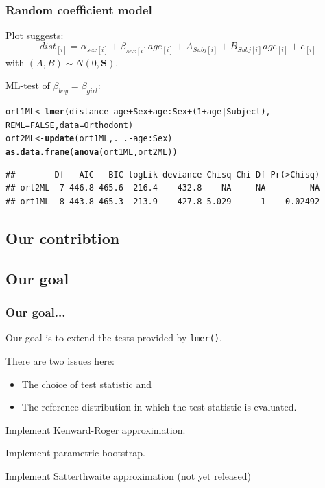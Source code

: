 \documentclass[compress]{beamer}\usepackage[]{graphicx}\usepackage[]{color}
\makeatletter
\newcommand{\hlnum}[1]{\textcolor[rgb]{0.686,0.059,0.569}{#1}}%
\newcommand{\hlopt}[1]{\textcolor[rgb]{0,0,0}{#1}}%
\newcommand{\hlstd}[1]{\textcolor[rgb]{0.345,0.345,0.345}{#1}}%
\newcommand{\hlkwb}[1]{\textcolor[rgb]{0.69,0.353,0.396}{#1}}%
\newcommand{\hlkwc}[1]{\textcolor[rgb]{0.333,0.667,0.333}{#1}}%
\newcommand{\hlkwd}[1]{\textcolor[rgb]{0.737,0.353,0.396}{\textbf{#1}}}%
\newenvironment{kframe}{%
 \def\at@end@of@kframe{}%
 \ifinner\ifhmode%
  \def\at@end@of@kframe{\end{minipage}}%
  \begin{minipage}{\columnwidth}%
 \fi\fi%
 \def\FrameCommand##1{\hskip\@totalleftmargin \hskip-\fboxsep
 \colorbox{shadecolor}{##1}\hskip-\fboxsep
     \hskip-\linewidth \hskip-\@totalleftmargin \hskip\columnwidth}%
 \MakeFramed {\advance\hsize-\width
   \@totalleftmargin\z@ \linewidth\hsize
   \@setminipage}}%
 {\par\unskip\endMakeFramed%
 \at@end@of@kframe}
\newenvironment{knitrout}{}{} %
\def\lmer{\texttt{lmer()}}
\newenvironment{sframe}
{\begin{frame} [containsverbatim] }
  {\end{frame}}
\makeatother
\begin{document}
\begin{sframe}
  \frametitle{Random coefficient model}
  Plot suggests:
\[
dist_{[i]} = \alpha_{sex[i]}
+ \beta_{sex[i]} age_{[i]} + A_{Subj[i]} +
B_{Subj[i]} age_{[i]} + e_{[i]}
\]
with $(A,B) \sim N(0,\bm S)$.

ML-test of $\beta_{boy}=\beta_{girl}$:
\begin{knitrout}\scriptsize
{}\color{fgcolor}\begin{kframe}
\begin{alltt}
\hlstd{ort1ML}\hlkwb{<-} \hlkwd{lmer}\hlstd{(distance} \hlopt{~} \hlstd{age} \hlopt{+} \hlstd{Sex} \hlopt{+} \hlstd{age}\hlopt{:}\hlstd{Sex} \hlopt{+} \hlstd{(}\hlnum{1} \hlopt{+} \hlstd{age} \hlopt{|} \hlstd{Subject),}
                  \hlkwc{REML} \hlstd{=} \hlnum{FALSE}\hlstd{,} \hlkwc{data}\hlstd{=Orthodont)}
\hlstd{ort2ML}\hlkwb{<-} \hlkwd{update}\hlstd{(ort1ML, .}\hlopt{~}\hlstd{.} \hlopt{-} \hlstd{age}\hlopt{:}\hlstd{Sex)}
\hlkwd{as.data.frame}\hlstd{(}\hlkwd{anova}\hlstd{(ort1ML, ort2ML))}
\end{alltt}
\begin{verbatim}
##        Df   AIC   BIC logLik deviance Chisq Chi Df Pr(>Chisq)
## ort2ML  7 446.8 465.6 -216.4    432.8    NA     NA         NA
## ort1ML  8 443.8 465.3 -213.9    427.8 5.029      1    0.02492
\end{verbatim}
\end{kframe}
\end{knitrout}
\end{sframe}


\subsection{Our contribtion}
\label{sec:packages-we-need}



\subsection{Our goal}
\label{sec:our-goal}

\begin{sframe}
\frametitle{Our goal...}
Our goal is to extend the tests provided by \lmer.

There are two issues here:

\begin{itemize}
\item  The choice of test statistic and
  
\item  The reference distribution in which the test statistic is evaluated.
  
\end{itemize}

Implement Kenward-Roger approximation.

Implement parametric bootstrap.

Implement Satterthwaite approximation (not yet released)

\end{sframe}
\end{document}
